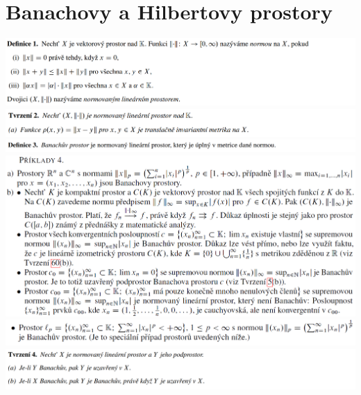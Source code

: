 \documentclass[12pt,a4paper]{article}
\begin{document}
\section{Banachovy a Hilbertovy prostory}
	\begin{center}
		\includegraphics[width=\textwidth]{img/2banHilb/2020-06-20 17 15 17.png}\vspace{0.3cm}
		\includegraphics[width=\textwidth]{img/2banHilb/2020-06-20 17 15 31.png}\vspace{0.3cm}
		\includegraphics[width=\textwidth]{img/2banHilb/2020-06-20 17 15 40.png}\vspace{0.3cm}
		\includegraphics[width=\textwidth]{img/2banHilb/2020-06-21 16 37 42.png}\vspace{0.3cm}
		\includegraphics[width=\textwidth]{img/2banHilb/2020-06-21 16 38 27.png}\vspace{0.3cm}
		\includegraphics[width=\textwidth]{img/2banHilb/2020-06-20 17 15 47.png}\vspace{0.3cm}

\end{center}
\end{document}
